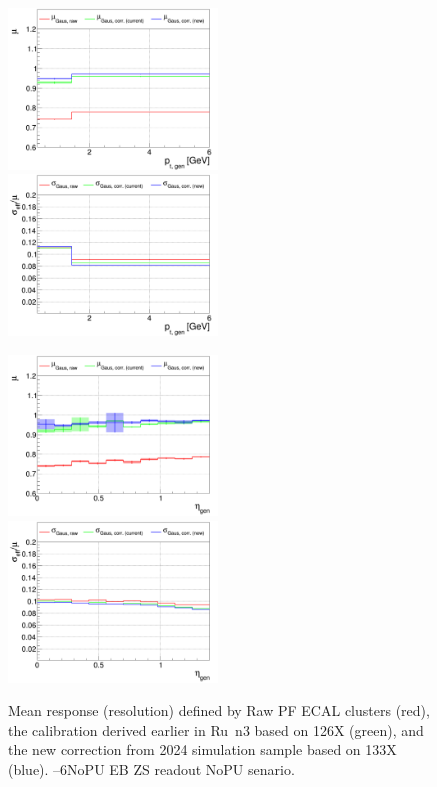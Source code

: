 \begin{figure}
\includegraphics[width=0.495\textwidth]{./plots_pdf/ECAL_plots/plotsNOPU/EB/ZS/pdf/GENPT/EBZS_GENPT_0000_0006_MuOverBins.pdf}
\includegraphics[width=0.495\textwidth]{./plots_pdf/ECAL_plots/plotsNOPU/EB/ZS/pdf/GENPT/EBZS_GENPT_0000_0006_EffSigmaOverBins.pdf}

\includegraphics[width=0.495\textwidth]{./plots_pdf/ECAL_plots/plotsNOPU/EB/ZS/pdf/GENETA/EBZS_GENETA_0000_0006_MuOverBins.pdf}
\includegraphics[width=0.495\textwidth]{./plots_pdf/ECAL_plots/plotsNOPU/EB/ZS/pdf/GENETA/EBZS_GENETA_0000_0006_EffSigmaOverBins.pdf}
\caption[$\mu$ ($\sigma_\mathrm{eff}$) vs \pt of PF ECAL cluster - EB ZS readout NoPU  senario]{Mean response (resolution) defined by Raw PF ECAL clusters (red), the calibration derived earlier in Ru\
n3 based on 126X (green), and the new correction from 2024 simulation sample based on 133X (blue). --6\GeV NoPU EB ZS readout NoPU senario.}
\end{figure}

